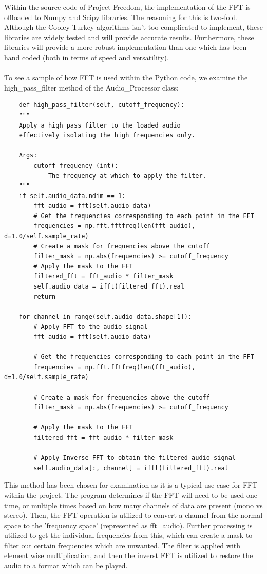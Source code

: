 \documentclass[notitlepage]{article}
\begin{document}
Within the source code of Project Freedom, the implementation of the FFT
is offloaded to Numpy and Scipy libraries. The reasoning for this is two-fold.
Although the Cooley-Turkey algorithms isn't too complicated to implement,
these libraries are widely tested and will provide accurate results. Furthermore,
these libraries will provide a more robust implementation than one which has been hand coded
(both in terms of speed and versatility).
\\\\
To see a sample of how FFT is used within the Python code, we examine the
high\_pass\_filter method of the Audio\_Processor class:
\begin{lstlisting}
    def high_pass_filter(self, cutoff_frequency):
    """
    Apply a high pass filter to the loaded audio
    effectively isolating the high frequencies only.

    Args:
        cutoff_frequency (int): 
            The frequency at which to apply the filter.
    """
    if self.audio_data.ndim == 1:
        fft_audio = fft(self.audio_data)
        # Get the frequencies corresponding to each point in the FFT
        frequencies = np.fft.fftfreq(len(fft_audio), d=1.0/self.sample_rate)
        # Create a mask for frequencies above the cutoff
        filter_mask = np.abs(frequencies) >= cutoff_frequency
        # Apply the mask to the FFT
        filtered_fft = fft_audio * filter_mask
        self.audio_data = ifft(filtered_fft).real
        return
    
    for channel in range(self.audio_data.shape[1]):
        # Apply FFT to the audio signal
        fft_audio = fft(self.audio_data)

        # Get the frequencies corresponding to each point in the FFT
        frequencies = np.fft.fftfreq(len(fft_audio), d=1.0/self.sample_rate)

        # Create a mask for frequencies above the cutoff
        filter_mask = np.abs(frequencies) >= cutoff_frequency

        # Apply the mask to the FFT
        filtered_fft = fft_audio * filter_mask

        # Apply Inverse FFT to obtain the filtered audio signal
        self.audio_data[:, channel] = ifft(filtered_fft).real
\end{lstlisting}

This method has been chosen for examination as it is a typical use case for FFT within
the project. The program determines if the FFT will need to be used one time, or multiple
times based on how many channels of data are present (mono vs stereo). Then, the FFT
operation is utilized to convert a channel from the normal space to the 'frequency space'
(represented as fft\_audio). Further processing is utilized to get the individual frequencies
from this, which can create a mask to filter out certain frequencies which are unwanted.
The filter is applied with element wise multiplication, and then the inverst FFT is utilized
to restore the audio to a format which can be played.
\end{document}
